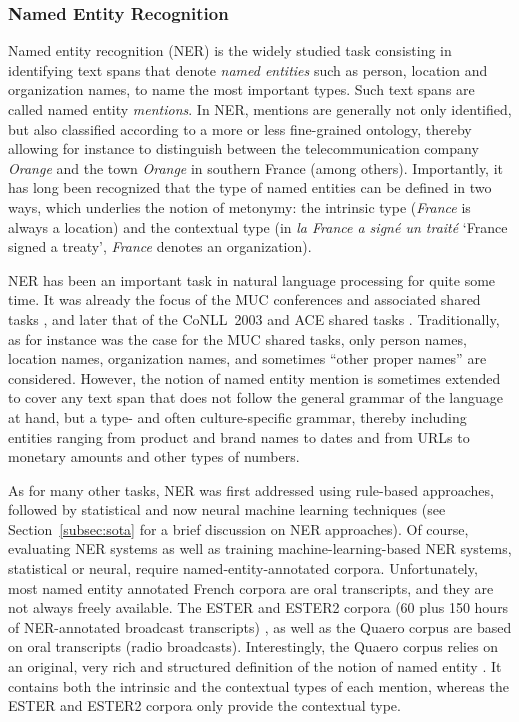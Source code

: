 \subsubsection{Named Entity Recognition}

Named entity recognition (NER) is the widely studied task consisting in identifying text spans that denote \emph{named entities} such as person, location and organization names, to name the most important types. Such text spans are called named entity \emph{mentions}. In NER, mentions are generally not only identified, but also classified according to a more or less fine-grained ontology, thereby allowing for instance to distinguish between the telecommunication company \emph{Orange} and the town \emph{Orange} in southern France (among others). Importantly, it has long been recognized that the type of named entities can be defined in two ways, which underlies the notion of metonymy: the intrinsic type (\emph{France} is always a location) and the contextual type (in \emph{la France a signé un traité} `France signed a treaty', \emph{France} denotes an organization).

NER has been an important task in natural language processing for quite some time. It was already the focus of the MUC conferences and associated shared tasks \citep{marsh-perzanowski-1998-muc}, and later that of the CoNLL~2003 and ACE shared tasks \citep{tjong-kim-sang-de-meulder-2003-introduction,doddington-etal-2004-automatic}. Traditionally, as for instance was the case for the MUC shared tasks, only person names, location names, organization names, and sometimes ``other proper names'' are considered. However, the notion of named entity mention is sometimes extended to cover any text span that does not follow the general grammar of the language at hand, but a type- and often culture-specific grammar, thereby including entities ranging from product and brand names to dates and from URLs to monetary amounts and other types of numbers.

As for many other tasks, NER was first addressed using rule-based approaches, followed by statistical and now neural machine learning techniques (see Section~\ref{subsec:sota} for a brief discussion on NER approaches). Of course, evaluating NER systems as well as training machine-learning-based NER systems, statistical or neural, require named-entity-annotated corpora. Unfortunately, most named entity annotated French corpora are oral transcripts, and they are not always freely available. The ESTER and ESTER2 corpora (60 plus 150 hours of NER-annotated broadcast transcripts) \citep{galliano-etal-2005-the,galliano-etal-2009-the}, as well as the Quaero \citep{grouin-etal-2011-proposal} corpus are based on oral transcripts (radio broadcasts). Interestingly, the Quaero corpus relies on an original, very rich and structured  definition of the notion of named entity \citep{rosset-etal-2011-entites}. It contains both the intrinsic and the contextual types of each mention, whereas the ESTER and ESTER2 corpora only provide the contextual type.


